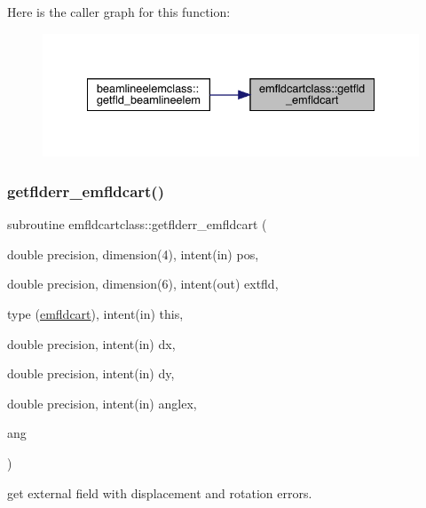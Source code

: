 Here is the caller graph for this function\+:\nopagebreak
\begin{figure}[H]
\begin{center}
\leavevmode
\includegraphics[width=334pt]{namespaceemfldcartclass_a77a88279f5b3f9878199cf20d7e4c5a5_icgraph}
\end{center}
\end{figure}
\mbox{\label{namespaceemfldcartclass_a4c48df0aca1d75a2301a87c5b1c0304d}} 
\subsubsection{\texorpdfstring{getflderr\_emfldcart()}{getflderr\_emfldcart()}}
{\footnotesize\ttfamily subroutine emfldcartclass\+::getflderr\+\_\+emfldcart (\begin{DoxyParamCaption}\item[{double precision, dimension(4), intent(in)}]{pos,  }\item[{double precision, dimension(6), intent(out)}]{extfld,  }\item[{type (\mbox{\hyperlink{namespaceemfldcartclass_structemfldcartclass_1_1emfldcart}{emfldcart}}), intent(in)}]{this,  }\item[{double precision, intent(in)}]{dx,  }\item[{double precision, intent(in)}]{dy,  }\item[{double precision, intent(in)}]{anglex,  }\item[{}]{ang }\end{DoxyParamCaption})}



get external field with displacement and rotation errors. 

